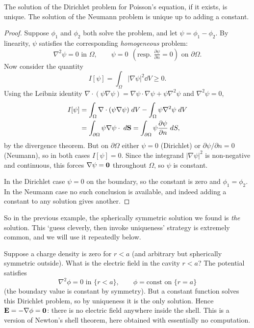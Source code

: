 \documentclass[a4paper]{scrartcl}
\begin{document}
\begin{theorem}
	The solution of the Dirichlet problem for Poisson's equation, if it exists, is unique. The solution of the Neumann problem is unique up to adding a constant.
\end{theorem}
\begin{proof}
	Suppose $\phi_1$ and $\phi_2$ both solve the problem, and let $\psi = \phi_1 - \phi_2$. By linearity, $\psi$ satisfies the corresponding \emph{homogeneous} problem:
	$$
	\nabla^2 \psi = 0 \text{ in } \Omega, \quad \quad \psi = 0 \;\, \left(\text{resp. } \tfrac{\partial \psi}{\partial n} = 0\right) \text{ on } \partial \Omega.
	$$
	Now consider the quantity
	$$
	I[\psi] = \int_\Omega |\nabla \psi|^2 \dd V \geq 0.
	$$
	Using the Leibniz identity $\nabla \cdot (\psi \nabla \psi) = \nabla \psi \cdot \nabla \psi + \psi \nabla^2 \psi$ and $\nabla^2 \psi = 0$,
	\begin{align*}
		I[\psi] &= \int_\Omega \nabla \cdot (\psi \nabla \psi) \; d V - \int_\Omega \psi \nabla^2 \psi \; d V \\
		&= \int_{\partial \Omega} \psi \nabla \psi \cdot \; d \mathbf{S} = \int_{\partial \Omega} \psi \frac{\partial \psi}{\partial n} \; d S,
	\end{align*}
	by the divergence theorem. But on $\partial \Omega$ either $\psi = 0$ (Dirichlet) or $\partial \psi/\partial n = 0$ (Neumann), so in both cases $I[\psi] = 0$. Since the integrand $|\nabla \psi|^2$ is non-negative and continuous, this forces $\nabla \psi = \mathbf{0}$ throughout $\Omega$, so $\psi$ is constant.

	In the Dirichlet case $\psi = 0$ on the boundary, so the constant is zero and $\phi_1 = \phi_2$. In the Neumann case no such conclusion is available, and indeed adding a constant to any solution gives another.
\end{proof}

So in the previous example, the spherically symmetric solution we found is \emph{the} solution. This `guess cleverly, then invoke uniqueness' strategy is extremely common, and we will use it repeatedly below.

\begin{example}
	Suppose a charge density is zero for $r < a$ (and arbitrary but spherically symmetric outside). What is the electric field in the cavity $r < a$? The potential satisfies
	$$
	\nabla^2 \phi = 0 \text{ in } \{r < a\}, \quad \quad \phi = \text{const on } \{r = a\}
	$$
	(the boundary value is constant by symmetry). But a constant function solves this Dirichlet problem, so by uniqueness it is the only solution. Hence $\mathbf{E} = -\nabla \phi = \mathbf{0}$: there is no electric field anywhere inside the shell. This is a version of Newton's shell theorem, here obtained with essentially no computation.
\end{example}
\end{document}
